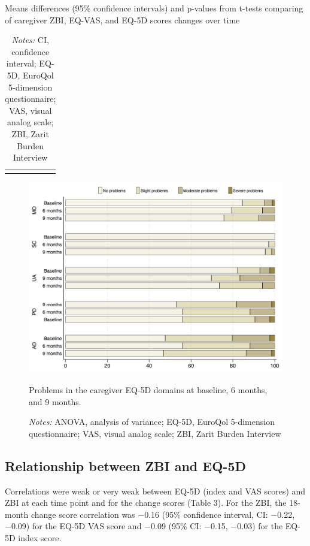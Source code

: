\documentclass[12pt]{article}
\begin{document}
\begin{table}[H]
    \centering \singlespacing \small
    \caption{Means differences (95\% confidence intervals) and p-values from t-tests comparing of caregiver ZBI, EQ-VAS, and EQ-5D scores changes over time}
    \begin{tabular}{|L{6cm}|C{5cm}|C{2.5cm}|}
        \hline
    \end{tabular}
    \label{outcome-scores-time}
    \caption*{\footnotesize 
                \textit{Notes:} CI, confidence interval; EQ-5D, EuroQol 5-dimension questionnaire; VAS, visual analog scale; ZBI, Zarit Burden Interview}
\end{table}


\hspace{1em}
\begin{figure}[H]
    \centering
    \includegraphics[width=1\linewidth]{figures/eq5d-domains-time.png}
    \caption{Problems in the caregiver EQ-5D domains at baseline, 6 months, and 9 months.}
    \label{fig:eq5d-scores-time}
    \caption*{\footnotesize \textit{Notes:} ANOVA, analysis of variance; EQ-5D, EuroQol 5-dimension questionnaire; VAS, visual analog scale; ZBI, Zarit Burden Interview}
\end{figure}

\subsection{Relationship between ZBI and EQ-5D}
Correlations were weak or very weak between EQ-5D (index and VAS scores) and ZBI at each time point and for the change scores (Table 3). For the ZBI, the 18-month change score correlation was −0.16 (95\% confidence interval, CI: −0.22, −0.09) for the EQ-5D VAS score and −0.09 (95\% CI: −0.15, −0.03) for the EQ- 5D index score.
\end{document}
